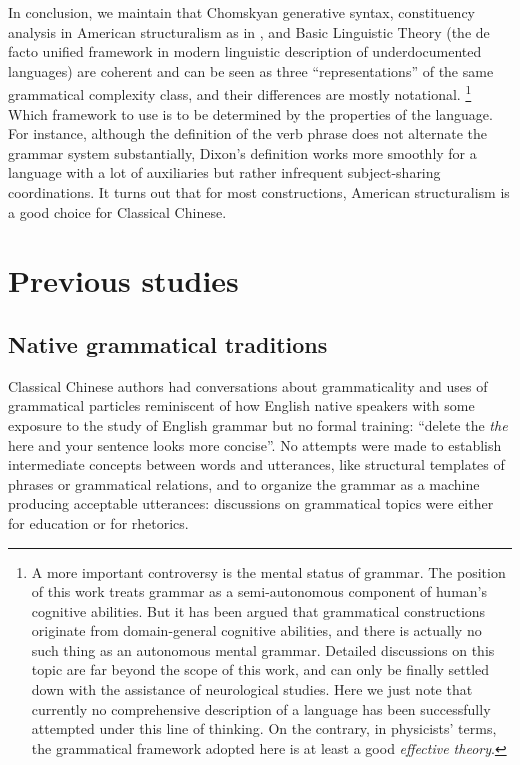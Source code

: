 \documentclass[UTF8, a4paper, oneside, scheme=plain, 12pt]{ctexrep}
\newcommand*{\term}[1]{\emph{#1}}
\newcommand{\form}[1]{\emph{#1}}
\begin{document}
{In conclusion, we maintain that Chomskyan generative syntax,
constituency analysis in American structuralism as in \citet{cgel},
and Basic Linguistic Theory (the de facto unified framework in modern linguistic description of underdocumented languages) are coherent and can be seen as three ``representations'' of the same grammatical complexity class,
and their differences are mostly notational.%
\footnote{
    A more important controversy is the mental status of grammar.
    The position of this work treats grammar as a semi-autonomous component of human's cognitive abilities.
    But it has been argued that grammatical constructions originate from domain-general cognitive abilities, and there is actually no such thing as an autonomous mental grammar.
    Detailed discussions on this topic are far beyond the scope of this work,
    and can only be finally settled down with the assistance of neurological studies.
    Here we just note that currently no comprehensive description of a language has been successfully attempted under this line of thinking.
    On the contrary, in physicists' terms, the grammatical framework adopted here is at least a good \term{effective theory}.
}
Which framework to use is to be determined by the properties of the language.
For instance, although the definition of the verb phrase does not alternate the grammar system substantially,
Dixon's definition works more smoothly for a language with a lot of auxiliaries but rather infrequent subject-sharing coordinations.
It turns out that for most constructions, American structuralism is a good choice for Classical Chinese.


}

\section{Previous studies}

\subsection{Native grammatical traditions}\label{sec:introduction.previous.tradition}

Classical Chinese authors had conversations about grammaticality 
and uses of grammatical particles
reminiscent of how English native speakers
with some exposure to the study of English grammar but no formal training:
``delete the \form{the} here and your sentence looks more concise''.
No attempts were made to establish intermediate concepts between words and utterances,
like structural templates of phrases or grammatical relations, 
and to organize the grammar as a machine producing acceptable utterances:
discussions on grammatical topics were either for education or for rhetorics.
\end{document}
